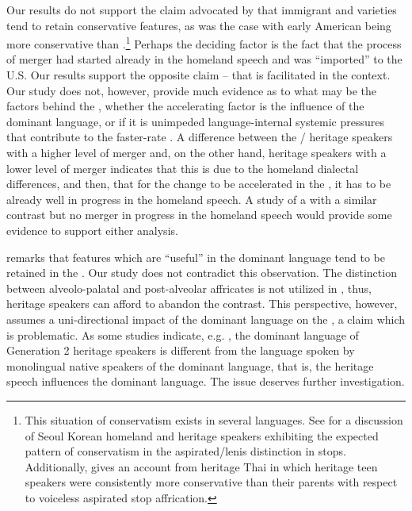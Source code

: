 \documentclass[output=paper,modfonts,newtxmath,hidelinks,]{langscibook}
\begin{document}
\largerpage[2]
Our results do not support the claim advocated by \citet{Polinsky2018} that immigrant and  varieties tend to retain conservative features, as was the case with early American  being more conservative than .\footnote{This situation of conservatism exists in several languages. See \citet{Kang-Nagy2012} for a discussion of Seoul Korean homeland and heritage speakers exhibiting the expected pattern of conservatism in the aspirated/lenis distinction in stops. Additionally, \citet{Thepboriruk2015} gives an account from heritage Thai in which heritage teen speakers were consistently more conservative than their parents with respect to voiceless aspirated stop affrication.} Perhaps the deciding factor is the fact that the process of merger had started already in the homeland speech and was “imported” to the U.S. Our results support the opposite claim – that  is facilitated in the  context. Our study does not, however, provide much evidence as to what may be the factors behind the , whether the accelerating factor is the influence of the dominant language, or if it is unimpeded language-internal systemic pressures that contribute to the faster-rate . A difference between the / heritage speakers with a higher level of merger and, on the other hand,  heritage speakers with a lower level of merger indicates that this is due to the homeland dialectal differences, and then, that for the change to be accelerated in the , it has to be already well in progress in the homeland speech. A study of a  with a similar contrast but no merger in progress in the homeland speech would provide some evidence to support either analysis.



\citet{Polinsky2018} remarks that features which are “useful” in the dominant language tend to be retained in the . Our study does not contradict this observation. The distinction between alveolo-palatal and post-alveolar affricates is not utilized in , thus, heritage speakers can afford to abandon the contrast. This perspective, however, assumes a uni-directional impact of the dominant language on the , a claim which is problematic. As some studies indicate, e.g. \citet{Lyskawa2016}, the dominant language of Generation 2 heritage speakers is different from the language spoken by monolingual native speakers of the dominant language, that is, the heritage speech influences the dominant language. The issue deserves further investigation.
\end{document}
